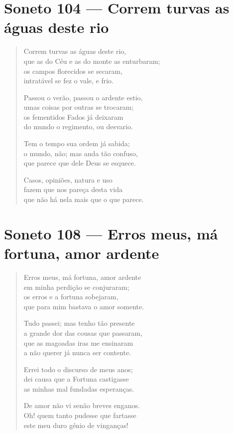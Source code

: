 \documentclass[10pt,a5paper,oneside]{book}
\begin{document}
\chapter{Soneto 104 --- Correm turvas as águas deste rio}

\begin{verse}
Correm turvas as águas deste rio,\\
que as do Céu e as do monte as enturbaram;\\
os campos florecidos se secaram,\\
intratável se fez o vale, e frio.

Passou o verão, passou o ardente estio,\\
umas coisas por outras se trocaram;\\
os fementidos Fados já deixaram\\
do mundo o regimento, ou desvario.

Tem o tempo sua ordem já sabida;\\
o mundo, não; mas anda tão confuso,\\
que parece que dele Deus se esquece.

Casos, opiniões, natura e uso\\
fazem que nos pareça desta vida\\
que não há nela mais que o que parece.
\end{verse}

\chapter{Soneto 108 --- Erros meus, má fortuna, amor ardente}

\begin{verse}
Erros meus, má fortuna, amor ardente\\
em minha perdição se conjuraram;\\
os erros e a fortuna sobejaram,\\
que para mim bastava o amor somente.

Tudo passei; mas tenho tão presente\\
a grande dor das cousas que passaram,\\
que as magoadas iras me ensinaram\\
a não querer já nunca ser contente.

Errei todo o discurso de meus anos;\\
dei causa que a Fortuna castigasse\\
as minhas mal fundadas esperanças.

De amor não vi senão breves enganos.\\
Oh! quem tanto pudesse que fartasse\\
este meu duro génio de vinganças!
\end{verse}
\end{document}
